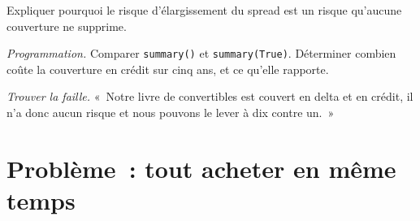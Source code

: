 \begin{exercise}[$\star\star$]\label{exo:s2:convertible-arbitrage:6}
Expliquer pourquoi le risque d'élargissement du spread est un risque qu'aucune couverture ne supprime.
\end{exercise}

\begin{exercise}[$\star\star\star$]\label{exo:s2:convertible-arbitrage:7}
\emph{Programmation.} Comparer \texttt{summary()} et \texttt{summary(True)}. Déterminer combien coûte la couverture en crédit sur cinq ans, et ce qu'elle rapporte.
\end{exercise}

\begin{exercise}[$\star\star\star$]\label{exo:s2:convertible-arbitrage:8}
\emph{Trouver la faille.} «~Notre livre de convertibles est couvert en delta et en crédit, il n'a donc aucun risque et nous pouvons le lever à dix contre un.~»
\end{exercise}

\section{Problème~: tout acheter en même temps}

